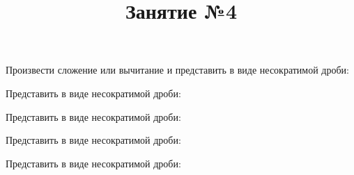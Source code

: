 \newpage
\title{Занятие №4}
\begin{listofex}
	\item Произвести сложение или вычитание и представить в виде несократимой дроби:
	\begin{enumcols}[itemcolumns=4]
		\item {}
		\item {}
		\item {}
		\item {}
	\end{enumcols}
	\item Представить в виде несократимой дроби:
	\begin{enumcols}[itemcolumns=3]
		\item {}
		\item {}
		\item {}
		\item {}
		\item {}
		\item {}
	\end{enumcols}
	\item Представить в виде несократимой дроби:
	\begin{enumcols}[itemcolumns=3]
		\item {}
		\item {}
		\item {}
		\item {}
		\item {}
	\end{enumcols}
	\item Представить в виде несократимой дроби:
	\begin{enumcols}[itemcolumns=2]
		\item {}
		\item {}
		\item {}
		\item {}
	\end{enumcols}
	\item Представить в виде несократимой дроби:
	\begin{enumcols}[itemcolumns=2]
		\item {}
		\item {}
		\item {}
		\item {}
		\item {}
		\item {}
		\item {}
		\item {}
		\item {}
		\item {}
	\end{enumcols}
\end{listofex}
